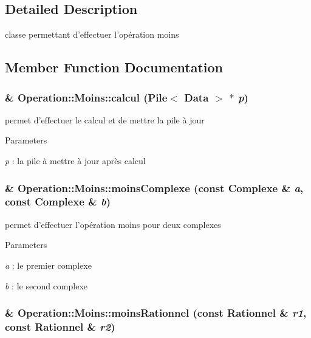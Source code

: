 \subsection{Detailed Description}
classe permettant d'effectuer l'opération moins 

\subsection{Member Function Documentation}
\hypertarget{classOperation_1_1Moins_a7dba34c5ff9f32018370b7aaf46bbc84}{
\subsubsection[{calcul}]{ \& Operation::Moins::calcul ({\bf Pile}$<$ {\bf Data} $>$ $\ast$ {\em p})}}
\label{classOperation_1_1Moins_a7dba34c5ff9f32018370b7aaf46bbc84}


permet d'effectuer le calcul et de mettre la pile à jour 


\begin{DoxyParams}{Parameters}
\item[{\em p}]: la pile à mettre à jour après calcul \end{DoxyParams}
\hypertarget{classOperation_1_1Moins_a1d49715fe851f1d09fdf9532c4c5e210}{
\subsubsection[{moinsComplexe}]{ \& Operation::Moins::moinsComplexe (const {\bf Complexe} \& {\em a}, \/  const {\bf Complexe} \& {\em b})}}
\label{classOperation_1_1Moins_a1d49715fe851f1d09fdf9532c4c5e210}


permet d'effectuer l'opération moins pour deux complexes 


\begin{DoxyParams}{Parameters}
\item[{\em a}]: le premier complexe \item[{\em b}]: le second complexe \end{DoxyParams}
\hypertarget{classOperation_1_1Moins_a84a64fdbd90f28955efd0ed26c80f597}{
\subsubsection[{moinsRationnel}]{ \& Operation::Moins::moinsRationnel (const {\bf Rationnel} \& {\em r1}, \/  const {\bf Rationnel} \& {\em r2})}}
\label{classOperation_1_1Moins_a84a64fdbd90f28955efd0ed26c80f597}


